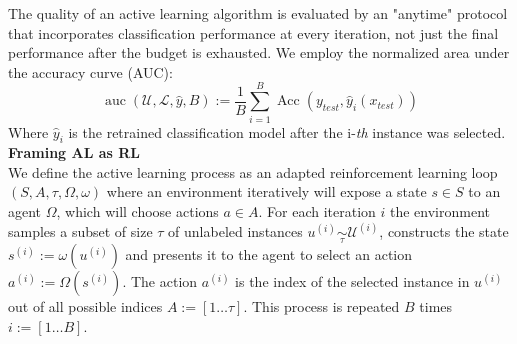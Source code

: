 \documentclass[]{article}
\begin{document}
The quality of an active learning algorithm is evaluated by an "anytime" protocol that incorporates classification performance at every iteration, not just the final performance after the budget is exhausted.
We employ the normalized area under the accuracy curve (AUC):
\begin{equation}
	\operatorname{auc}(\mathcal{U}, \mathcal{L}, \hat y, B) := \frac{1}{B} \sum_{i=1}^{B} \operatorname{Acc}(y_{test}, \hat y_i(x_{test}))
\end{equation}
Where $\hat y_i$ is the retrained classification model after the i-\textit{th} instance was selected. \\ [1mm]
%
\textbf{Framing AL as RL}\\
We define the active learning process as an adapted reinforcement learning loop $(S, A, \tau, \Omega, \omega)$ where an environment iteratively will expose a state $s \in S$ to an agent $\Omega$, which will choose actions $a \in A$.
For each iteration $i$ the environment samples a subset of size $\tau$ of unlabeled instances $u^{(i)} \underset{\tau}{\sim} \mathcal{U}^{(i)}$, constructs the state $s^{(i)} := \omega(u^{(i)})$ and presents it to the agent to select an action $a^{(i)} := \Omega(s^{(i)})$.
The action $a^{(i)}$ is the index of the selected instance in $u^{(i)}$ out of all possible indices $A := [1 \ldots \tau]$.
This process is repeated $B$ times $i := [1 \ldots B]$.
\end{document}
